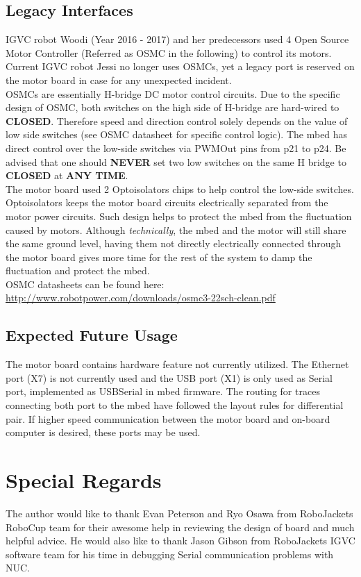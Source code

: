 \documentclass[letterpaper, 12pt]{article}
\begin{document}
\subsection{Legacy Interfaces}
IGVC robot Woodi (Year 2016 - 2017) and her predecessors used 4 Open Source Motor Controller (Referred as OSMC in the following) to control its motors. Current IGVC robot Jessi no longer uses OSMCs, yet a legacy port is reserved on the motor board in case for any unexpected incident. \vspace{6pt}\\
OSMCs are essentially H-bridge DC motor control circuits. Due to the specific design of OSMC, both switches on the high side of H-bridge are hard-wired to \textbf{CLOSED}. Therefore speed and direction control solely depends on the value of low side switches (see OSMC datasheet for specific control logic). The mbed has direct control over the low-side switches via PWMOut pins from p21 to p24. Be advised that one should \textbf{NEVER} set two low switches on the same H bridge to \textbf{CLOSED} at \textbf{ANY TIME}. \vspace{6pt}\\
The motor board used 2 Optoisolators chips to help control the low-side switches. Optoisolators keeps the motor board circuits electrically separated from the motor power circuits. Such design helps to protect the mbed from the fluctuation caused by motors. Although \emph{technically}, the mbed and the motor will still share the same ground level, having them not directly electrically connected through the motor board gives more time for the rest of the system to damp the fluctuation and protect the mbed. \vspace{6pt}\\
OSMC datasheets can be found here: \url{http://www.robotpower.com/downloads/osmc3-22sch-clean.pdf}\\

\subsection{Expected Future Usage}
The motor board contains hardware feature not currently utilized. The Ethernet port (X7) is not currently used and the USB port (X1) is only used as Serial port, implemented as USBSerial in mbed firmware. The routing for traces connecting both port to the mbed have followed the layout rules for differential pair. If higher speed communication between the motor board and on-board computer is desired, these ports may be used.

\section{Special Regards}
The author would like to thank Evan Peterson and Ryo Osawa from RoboJackets RoboCup team for their awesome help in reviewing the design of board and much helpful advice. He would also like to thank Jason Gibson from RoboJackets IGVC software team for his time in debugging Serial communication problems with NUC.  
\end{document}
